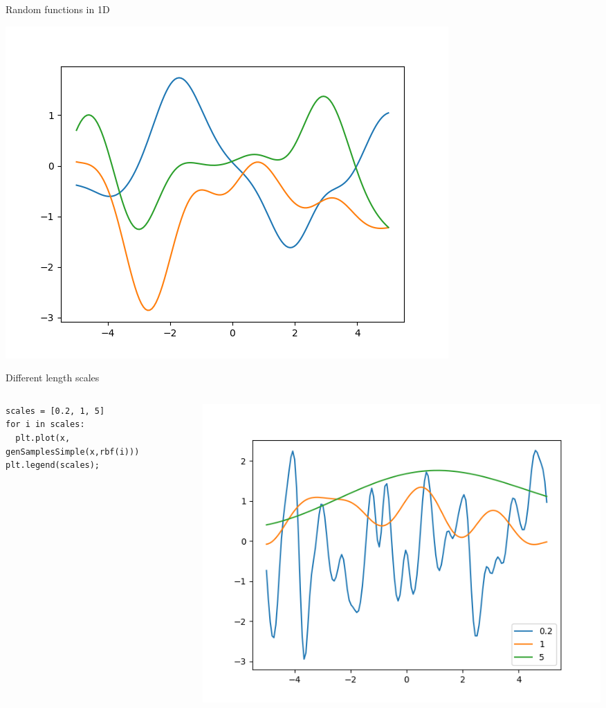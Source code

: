 \documentclass[presentation]{beamer}
\begin{document}
\begin{frame}[label={sec:orge696b02}]{Random functions in 1D}
\begin{center}
\includegraphics[width=.9\linewidth]{images/fig01.png}
\end{center}
\end{frame}


\begin{frame}[fragile,label={sec:org45154ca}]{Different length scales}
 \begin{columns}
\begin{column}{0.45\columnwidth}
\begin{verbatim}
scales = [0.2, 1, 5]
for i in scales:
  plt.plot(x, genSamplesSimple(x,rbf(i)))
plt.legend(scales);
\end{verbatim}
\end{column}


\begin{column}{0.45\columnwidth}
\begin{center}
\includegraphics[width=.9\linewidth]{images/fig02.png}
\end{center}
\end{column}
\end{columns}
\end{frame}
\end{document}

